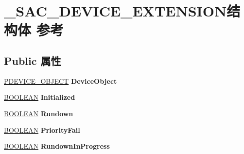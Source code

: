 \hypertarget{struct___s_a_c___d_e_v_i_c_e___e_x_t_e_n_s_i_o_n}{}\section{\+\_\+\+S\+A\+C\+\_\+\+D\+E\+V\+I\+C\+E\+\_\+\+E\+X\+T\+E\+N\+S\+I\+O\+N结构体 参考}
\label{struct___s_a_c___d_e_v_i_c_e___e_x_t_e_n_s_i_o_n}
\subsection*{Public 属性}
\begin{DoxyCompactItemize}
\item 
\mbox{\label{struct___s_a_c___d_e_v_i_c_e___e_x_t_e_n_s_i_o_n_a9e6c3808d630d07f4f3cf11a8d013df8}} 
\hyperlink{struct___d_e_v_i_c_e___o_b_j_e_c_t}{P\+D\+E\+V\+I\+C\+E\+\_\+\+O\+B\+J\+E\+CT} {\bfseries Device\+Object}
\item 
\mbox{\label{struct___s_a_c___d_e_v_i_c_e___e_x_t_e_n_s_i_o_n_a119befb5d46f3058823a86959ce48751}} 
\hyperlink{_processor_bind_8h_a112e3146cb38b6ee95e64d85842e380a}{B\+O\+O\+L\+E\+AN} {\bfseries Initialized}
\item 
\mbox{\label{struct___s_a_c___d_e_v_i_c_e___e_x_t_e_n_s_i_o_n_adaa735d6900f369e1811148970c17689}} 
\hyperlink{_processor_bind_8h_a112e3146cb38b6ee95e64d85842e380a}{B\+O\+O\+L\+E\+AN} {\bfseries Rundown}
\item 
\mbox{\label{struct___s_a_c___d_e_v_i_c_e___e_x_t_e_n_s_i_o_n_a05f003d299622ddb37610bd703a10530}} 
\hyperlink{_processor_bind_8h_a112e3146cb38b6ee95e64d85842e380a}{B\+O\+O\+L\+E\+AN} {\bfseries Priority\+Fail}
\item 
\mbox{\label{struct___s_a_c___d_e_v_i_c_e___e_x_t_e_n_s_i_o_n_a634045f2ccddef64d168db50aae408ee}} 
\hyperlink{_processor_bind_8h_a112e3146cb38b6ee95e64d85842e380a}{B\+O\+O\+L\+E\+AN} {\bfseries Rundown\+In\+Progress}
\item 
\mbox{\label{struct___s_a_c___d_e_v_i_c_e___e_x_t_e_n_s_i_o_n_af96d1ae670f9d7d13fa8252ee53da48d}} 

\end{DoxyCompactItemize}
